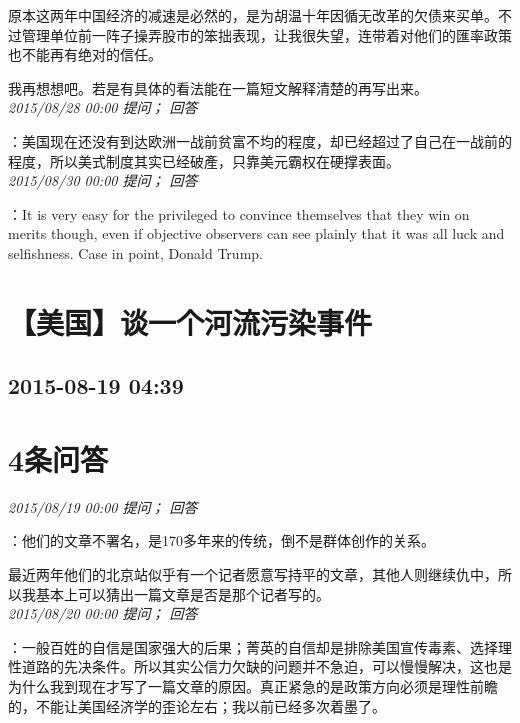 \documentclass[twocolumn]{ctexart}
\begin{document}
原本这两年中国经济的减速是必然的，是为胡温十年因循无改革的欠债来买单。不过管理单位前一阵子操弄股市的笨拙表现，让我很失望，连带着对他们的匯率政策也不能再有绝对的信任。

我再想想吧。若是有具体的看法能在一篇短文解释清楚的再写出来。\\

\textit{\hfill\noindent\small 2015/08/28 00:00 提问； 回答}

：美国现在还没有到达欧洲一战前贫富不均的程度，却已经超过了自己在一战前的程度，所以美式制度其实已经破產，只靠美元霸权在硬撑表面。\\

\textit{\hfill\noindent\small 2015/08/30 00:00 提问； 回答}

：It is very easy for the privileged to convince themselves that they win on merits though, even if objective observers can see plainly that it was all luck and selfishness. Case in point, Donald Trump.\\


\section{【美国】谈一个河流污染事件}
\subsection{2015-08-19 04:39}


\section{4条问答}

\textit{\hfill\noindent\small 2015/08/19 00:00 提问； 回答}

：他们的文章不署名，是170多年来的传统，倒不是群体创作的关系。

最近两年他们的北京站似乎有一个记者愿意写持平的文章，其他人则继续仇中，所以我基本上可以猜出一篇文章是否是那个记者写的。\\

\textit{\hfill\noindent\small 2015/08/20 00:00 提问； 回答}

：一般百姓的自信是国家强大的后果；菁英的自信却是排除美国宣传毒素、选择理性道路的先决条件。所以其实公信力欠缺的问题并不急迫，可以慢慢解决，这也是为什么我到现在才写了一篇文章的原因。真正紧急的是政策方向必须是理性前瞻的，不能让美国经济学的歪论左右；我以前已经多次着墨了。\\
\end{document}
